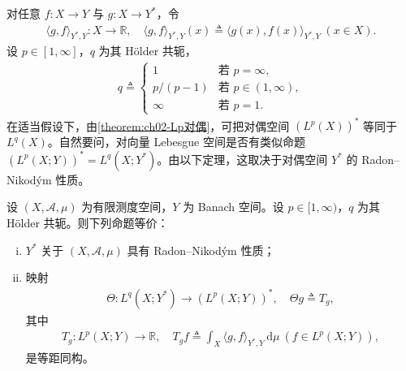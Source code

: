 \documentclass[../../main.tex]{subfiles}%
\begin{document}
对任意 $f:X\to Y$ 与 $g:X\to Y^*$，令
\begin{align*}
\langle g,f\rangle_{Y^*,Y}:X\to\mathbb{R},\quad \langle g,f\rangle_{Y^*,Y}(x)\triangleq \langle g(x),f(x)\rangle_{Y^*,Y}\ (x\in X).
\end{align*}
设 $p\in[1,\infty]$，$q$ 为其 Hölder 共轭，
\begin{align}
q\triangleq 
\begin{cases}
1 & \text{若 }p=\infty,\\
p/(p-1) & \text{若 }p\in(1,\infty),\\
\infty & \text{若 }p=1.
\end{cases} \label{align:ch04-4.89}
\end{align}
在适当假设下，由\cref{theorem:ch02-Lp对偶}，可把对偶空间 $(L^p(X))^*$ 等同于 $L^q(X)$。自然要问，对向量 Lebesgue 空间是否有类似命题 $(L^p(X;Y))^*=L^q(X;Y^*)$。由以下定理，这取决于对偶空间 $Y^*$ 的 Radon--Nikodým 性质。

\begin{theorem}\label{theorem:ch04-Lp对偶刻画}\label{proposition:ch04-对偶}
设 $(X,\mathcal{A},\mu)$ 为有限测度空间，$Y$ 为 Banach 空间。设 $p\in[1,\infty)$，$q$ 为其 Hölder 共轭。则下列命题等价：
\begin{enumerate}[(i)]
\item\label{item:ch04-Lp对偶刻画-i} $Y^*$ 关于 $(X,\mathcal{A},\mu)$ 具有 Radon--Nikodým 性质；
\item\label{item:ch04-Lp对偶刻画-ii} 映射
\begin{align}
\Theta:L^q(X;Y^*)\to(L^p(X;Y))^*,\quad \Theta g\triangleq T_g, \label{align:ch04-4.90a}
\end{align}
其中
\begin{align}
T_g:L^p(X;Y)\to\mathbb{R},\quad T_gf\triangleq \int_X\langle g,f\rangle_{Y^*,Y}\,\mathrm{d}\mu\ (f\in L^p(X;Y)), \label{align:ch04-4.90b}
\end{align}
是等距同构。
\end{enumerate}
\end{theorem}
\end{document}
